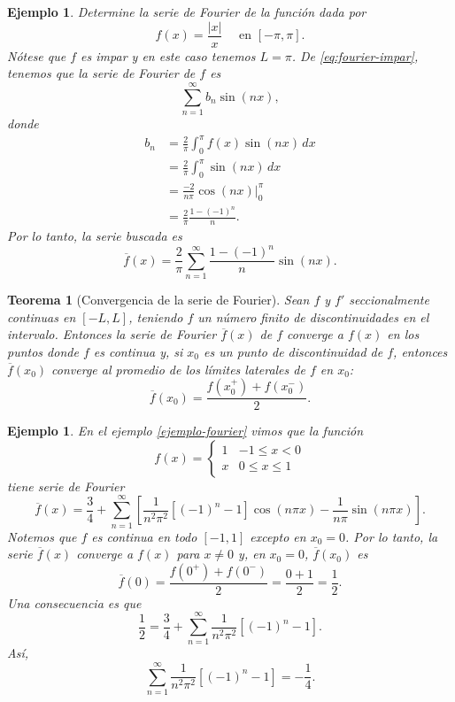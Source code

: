 \documentclass[11pt,letterpaper]{report}
\newtheorem{theorem}[defn]{Teorema}
\newtheorem{example}[defn]{Ejemplo}
\newcommand\<{\langle}
\renewcommand\>{\rangle}
\begin{document}
\begin{example}
  Determine la serie de Fourier de la función dada por
  \[
    f(x) = \frac{|x|}{x} \quad \text{ en } [-\pi,\pi]
  .\]
  Nótese que $f$ es impar y en este caso tenemos $L=\pi$.
  De \eqref{eq:fourier-impar},
  tenemos que la serie de Fourier de $f$ es
  \[
    \sum_{n=1}^{\infty}b_n\sin(nx)
  ,\]
  donde
  \begin{align*}
    b_n
    &= \frac{2}{\pi}\int_{0}^{\pi}f(x)\sin(nx)\,dx \\
    &= \frac{2}{\pi}\int_{0}^{\pi}\sin(nx)\,dx \\
    &= \frac{-2}{n\pi}\cos(nx)\Big|_{0}^{\pi} \\
    &= \frac{2}{\pi}\frac{1-(-1)^{n}}{n}.
  \end{align*}
  Por lo tanto, la serie buscada es
  \[
    \overline{f}(x)
    =
    \frac{2}{\pi}\sum_{n=1}^{\infty}\frac{1-(-1)^{n}}{n}\sin(nx)
  .\]
  
\end{example}

\begin{theorem}[Convergencia de la serie de Fourier]
  Sean $f$ y $f'$ seccionalmente continuas en $[-L,L]$, teniendo $f$
  un número finito de discontinuidades en el intervalo. Entonces la
  serie de Fourier $\overline{f}(x)$ de $f$ converge a $f(x)$ en los
  puntos donde $f$ es continua y, si $x_0$ es un punto de
  discontinuidad de $f$, entonces $\overline{f}(x_0)$ converge al
  promedio de los límites laterales de $f$ en $x_0$:
  \[
    \overline{f}(x_0) = \frac{f(x_0^{+})+f(x_0^{-})}{2}
  .\]
\end{theorem}

\begin{example}
  En el ejemplo \ref{ejemplo-fourier} vimos que la función
  \[
    f(x) =
    \begin{cases}
      1 & -1\leq x<0 \\
      x & 0\leq x\leq 1
    \end{cases}
  \]
  tiene serie de Fourier
  \[
    \overline{f}(x)
    =
    \frac{3}{4}
    +
    \sum_{n=1}^{\infty}
    \left[
      \frac{1}{n^{2}\pi^{2}}[(-1)^{n}-1]\cos(n\pi x)
      -\frac{1}{n\pi}\sin(n\pi x)
    \right]
  .\]
  Notemos que $f$ es continua en todo $[-1,1]$ excepto en $x_0=0$.
  Por lo tanto, la serie $\overline{f}(x)$ converge a $f(x)$ para
  $x\neq 0$ y, en $x_0=0$, $\overline{f}(x_0)$ es
  \[
    \overline{f}(0)
    =\frac{f(0^{+})+f(0^{-})}{2}
    = \frac{0+1}{2}
    =\frac{1}{2}
  .\]
  Una consecuencia es que
  \[
    \frac{1}{2} = \frac{3}{4} + 
    \sum_{n=1}^{\infty}
      \frac{1}{n^{2}\pi^{2}}[(-1)^{n}-1]
  .\]
  Así,
  \[
    \sum_{n=1}^{\infty}
      \frac{1}{n^{2}\pi^{2}}[(-1)^{n}-1]
    =
    - \frac{1}{4}
  .\]
\end{example}
\end{document}
